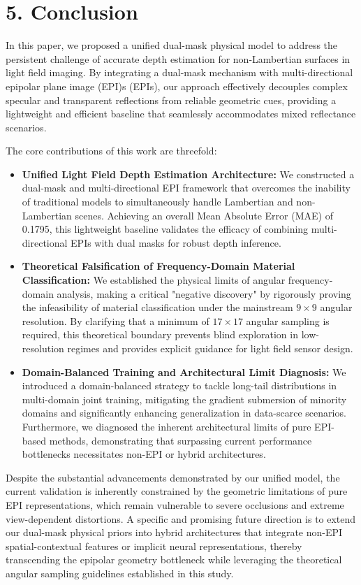 \section{5. Conclusion}


In this paper, we proposed a unified dual-mask physical model to address the persistent challenge of accurate depth estimation for non-Lambertian surfaces in light field imaging. By integrating a dual-mask mechanism with multi-directional epipolar plane image (EPI)s (EPIs), our approach effectively decouples complex specular and transparent reflections from reliable geometric cues, providing a lightweight and efficient baseline that seamlessly accommodates mixed reflectance scenarios.

The core contributions of this work are threefold:
\begin{itemize}
  \item \textbf{Unified Light Field Depth Estimation Architecture:} We constructed a dual-mask and multi-directional EPI framework that overcomes the inability of traditional models to simultaneously handle Lambertian and non-Lambertian scenes. Achieving an overall Mean Absolute Error (MAE) of 0.1795, this lightweight baseline validates the efficacy of combining multi-directional EPIs with dual masks for robust depth inference.
  \item \textbf{Theoretical Falsification of Frequency-Domain Material Classification:} We established the physical limits of angular frequency-domain analysis, making a critical "negative discovery" by rigorously proving the infeasibility of material classification under the mainstream $9 \times 9$ angular resolution. By clarifying that a minimum of $17 \times 17$ angular sampling is required, this theoretical boundary prevents blind exploration in low-resolution regimes and provides explicit guidance for light field sensor design.
  \item \textbf{Domain-Balanced Training and Architectural Limit Diagnosis:} We introduced a domain-balanced strategy to tackle long-tail distributions in multi-domain joint training, mitigating the gradient submersion of minority domains and significantly enhancing generalization in data-scarce scenarios. Furthermore, we diagnosed the inherent architectural limits of pure EPI-based methods, demonstrating that surpassing current performance bottlenecks necessitates non-EPI or hybrid architectures.
\end{itemize}
Despite the substantial advancements demonstrated by our unified model, the current validation is inherently constrained by the geometric limitations of pure EPI representations, which remain vulnerable to severe occlusions and extreme view-dependent distortions. A specific and promising future direction is to extend our dual-mask physical priors into hybrid architectures that integrate non-EPI spatial-contextual features or implicit neural representations, thereby transcending the epipolar geometry bottleneck while leveraging the theoretical angular sampling guidelines established in this study.


